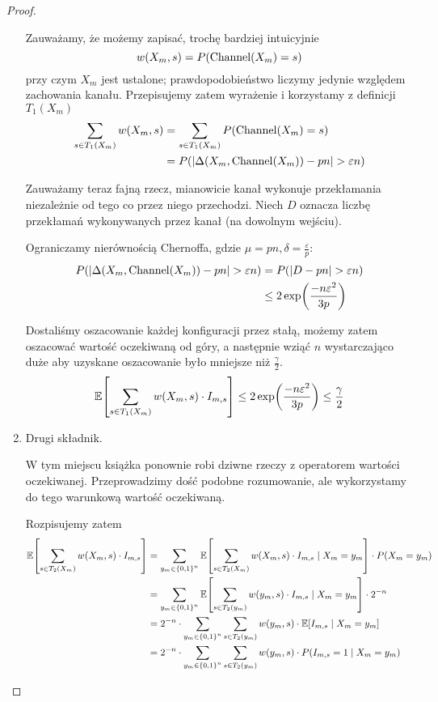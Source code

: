 \begin{proof}
\begin{enumerate}
        Zauważamy, że możemy zapisać, trochę bardziej intuicyjnie
        \[
            w(X_m, s) = P(\operatorname{Channel}(X_m) = s)
        \]
        przy czym \( X_m \) jest ustalone; prawdopodobieństwo liczymy jedynie względem zachowania kanału.
        Przepisujemy zatem wyrażenie i korzystamy z definicji \( T_1(X_m) \)
        \begin{align*}
            \sum_{s \in T_1(X_m)} w(X_m, s) 
                &= \sum_{s \in T_1(X_m)} P(\operatorname{Channel}(X_m) = s) \\
                &= P(\left\lvert\Delta(X_m, \operatorname{Channel}(X_m)) - pn\right\rvert > \varepsilon n)
        \end{align*}
        
        Zauważamy teraz fajną rzecz, mianowicie kanał wykonuje przekłamania niezależnie od tego co przez niego przechodzi.
        Niech \( D \) oznacza liczbę przekłamań wykonywanych przez kanał (na dowolnym wejściu).
        
        Ograniczamy nierównością Chernoffa, gdzie \( \mu = pn, \delta = \frac{\varepsilon}{p} \):
        \begin{align*}
            P(\abs{\Delta(X_m, \Channel(X_m)) - pn} > \varepsilon n)
                &= P(\abs{D - pn} > \varepsilon n) \\
                &\leq 2\exp\pars{\frac{-n\varepsilon^2}{3p}}
        \end{align*}
        
        Dostaliśmy oszacowanie każdej konfiguracji przez stałą, możemy zatem oszacować wartość oczekiwaną od góry, a następnie wziąć \( n \) wystarczająco duże aby uzyskane oszacowanie było mniejsze niż \( \frac{\gamma}{2} \).
        \[
            \expected{\sum_{s \in T_1(X_m)} w(X_m, s) \cdot I_{m, s}} \leq 2\exp\pars{\frac{-n\varepsilon^2}{3p}}\leq \frac{\gamma}{2}
        \]
        
    
        \item Drugi składnik.
        
        W tym miejscu książka ponownie robi dziwne rzeczy z operatorem wartości oczekiwanej. Przeprowadzimy dość podobne rozumowanie, ale wykorzystamy do tego warunkową wartość oczekiwaną.
        
        Rozpisujemy zatem
        \begin{align*}
            \expected{\sum_{s \in T_2(X_m)} w(X_m, s) \cdot I_{m, s}}
            &= \sum_{y_m \in \set{0, 1}^n} \expected{\sum_{s \in T_2(X_m)} w(X_m, s) \cdot I_{m, s} \mid X_m = y_m} \cdot P(X_m = y_m) \\
            &= \sum_{y_m \in \set{0, 1}^n} \expected{\sum_{s \in T_2(y_m)} w(y_m, s) \cdot I_{m, s} \mid X_m = y_m} \cdot 2^{-n} \\
            &= 2^{-n} \cdot \sum_{y_m \in \set{0, 1}^n} \sum_{s \in T_2(y_m)} w(y_m, s) \cdot \expected{I_{m, s} \mid X_m = y_m} \\
            &= 2^{-n} \cdot \sum_{y_m \in \set{0, 1}^n} \sum_{s \in T_2(y_m)} w(y_m, s) \cdot P(I_{m, s} = 1 \mid X_m = y_m)
        \end{align*}
        

\end{enumerate}
\end{proof}
